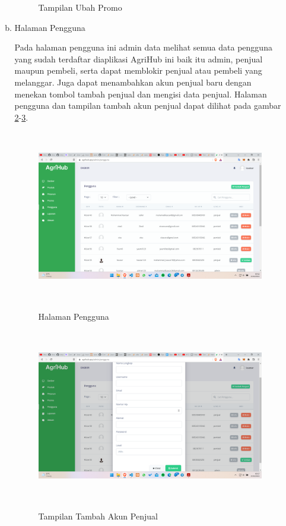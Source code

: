 \begin{enumerate}
\begin{enumerate}[a.]
\begin{figure}[H]
			\caption{Tampilan Ubah Promo}
			\label{ubah_promo}
		\end{figure}

		\item Halaman Pengguna
		\par Pada halaman pengguna ini admin data melihat semua data pengguna yang sudah terdaftar diaplikasi AgriHub ini baik itu admin, penjual maupun pembeli, serta dapat memblokir penjual atau pembeli yang melanggar. Juga dapat menambahkan akun penjual baru dengan menekan tombol tambah penjual dan mengisi data penjual. Halaman pengguna dan tampilan tambah akun penjual dapat dilihat pada gambar \ref*{pengguna}-\ref*{tambah_pengguna}.
		\begin{figure}[H]
			\centering
			{\includegraphics [width = 13cm, height= 7.5cm]{gambar/admin/pengguna}}
			\caption{Halaman Pengguna}
			\label{pengguna}
		\end{figure}
		\begin{figure}[H]
			\centering
			{\includegraphics [width = 13cm, height= 7.5cm]{gambar/admin/tambah_pengguna}}
			\caption{Tampilan Tambah Akun Penjual}
			\label{tambah_pengguna}
		\end{figure}


\end{enumerate}
\end{enumerate}
